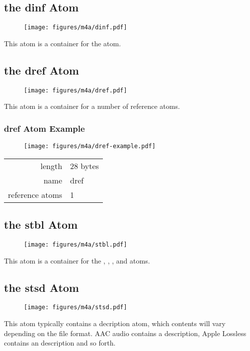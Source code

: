 \clearpage

\subsection{the dinf Atom}
\label{atom:dinf}
\begin{figure}[h]
  \texttt{[image: figures/m4a/dinf.pdf]}
\end{figure}
\par
\noindent
This atom is a container for the \hyperref[atom:dref]{} atom.

\subsection{the dref Atom}
\label{atom:dref}
\begin{figure}[h]
\texttt{[image: figures/m4a/dref.pdf]}
\end{figure}
\par
\noindent
This atom is a container for a number of reference atoms.

\subsubsection{dref Atom Example}
\begin{figure}[h]
  \texttt{[image: figures/m4a/dref-example.pdf]}
\end{figure}
\begin{tabular}{rl}
  \textsf{length} & 28 bytes \\
  \textsf{name} & \textsf{dref} \\
  \textsf{reference atoms} & 1 \\
\end{tabular}

\clearpage

\subsection{the stbl Atom}
\label{atom:stbl}
\begin{figure}[h]
  \texttt{[image: figures/m4a/stbl.pdf]}
\end{figure}
\par
\noindent
This atom is a container for the
\hyperref[atom:stsd]{},
\hyperref[atom:stts]{},
\hyperref[atom:stsc]{},
\hyperref[atom:stsz]{} and
\hyperref[atom:stco]{} atoms.

\clearpage

\subsection{the stsd Atom}
\label{atom:stsd}
\begin{figure}[h]
\texttt{[image: figures/m4a/stsd.pdf]}
\end{figure}
\par
\noindent
This atom typically contains a decription atom,
which contents will vary depending on the file format.
AAC audio contains a  description,
Apple Lossless contains an  description
and so forth.

